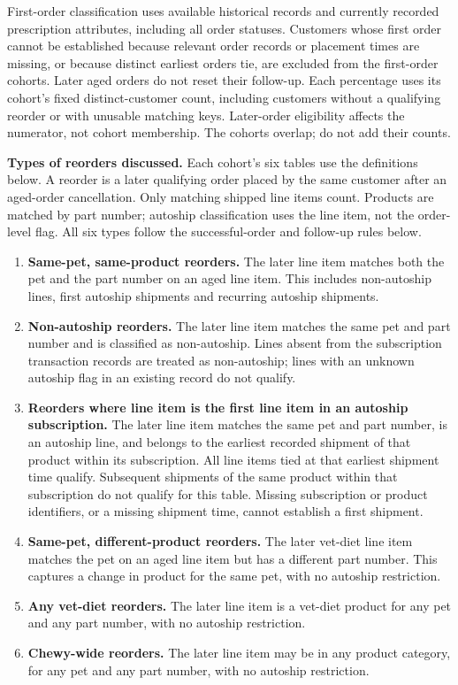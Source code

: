First-order classification uses available historical records and currently
recorded prescription attributes, including all order statuses. Customers
whose first order cannot be established because relevant order records or
placement times are missing, or because distinct earliest orders tie, are
excluded from the first-order cohorts. Later aged orders do not reset their
follow-up. Each percentage uses its cohort's fixed distinct-customer count,
including customers without a qualifying reorder or with unusable matching
keys. Later-order eligibility affects the numerator, not cohort membership.
The cohorts overlap; do not add their counts.

\par\medskip
\noindent\textbf{Types of reorders discussed.}
Each cohort's six tables use the definitions below. A reorder is a later
qualifying order placed by the same customer after an aged-order cancellation.
Only matching shipped line items count. Products are matched by part number;
autoship classification uses the line item, not the order-level flag. All
six types follow the successful-order and follow-up rules below.

\begin{enumerate}
\item \textbf{Same-pet, same-product reorders.} The later line item matches
both the pet and the part number on an aged line item. This includes
non-autoship lines, first autoship shipments and recurring autoship shipments.

\item \textbf{Non-autoship reorders.} The later line item matches the same
pet and part number and is classified as non-autoship. Lines absent from the
subscription transaction records are treated as non-autoship; lines with
an unknown autoship flag in an existing record do not qualify.

\item \textbf{Reorders where line item is the first line item in an
autoship subscription.}
The later line item matches the same pet and part number, is an autoship
line, and belongs to the earliest recorded shipment of that product within
its subscription. All line items tied at that earliest shipment time qualify.
Subsequent shipments of the same product within that subscription do not
qualify for this table. Missing subscription or product identifiers, or a
missing shipment time, cannot establish a first shipment.

\item \textbf{Same-pet, different-product reorders.} The later vet-diet line
item matches the pet on an aged line item but has a different part number.
This captures a change in product for the same pet, with no autoship restriction.

\item \textbf{Any vet-diet reorders.} The later line item is a vet-diet
product for any pet and any part number, with no autoship restriction.

\item \textbf{Chewy-wide reorders.} The later line item may be in any product
category, for any pet and any part number, with no autoship restriction.
\end{enumerate}

